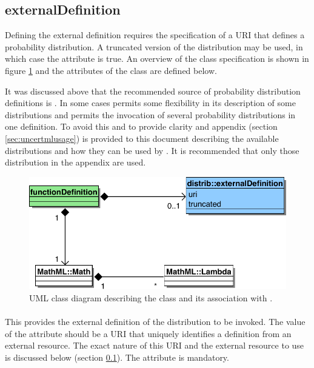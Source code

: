 \documentclass[draftspec]{sbmlpkgspec}
\begin{document}
\subsection{externalDefinition}
\label{sec:extlDefnDistn}

Defining the external definition requires the specification of a URI
that defines a probability distribution. A truncated version of the
distribution may be used, in which case the 
attribute is true. An overview of the class specification is shown in
figure \ref{fig:externalDefinitionUml} and the attributes of the class
are defined below.

It was discussed above that the recommended source of probability
distribution definitions is \uncertml. In some cases \uncertml permits
some flexibility in its description of some distributions and permits
the invocation of several probability distributions in one
definition. To avoid this and to provide clarity and appendix (section
\ref{sec:uncertmlusage}) is provided to this document describing the
available distributions and how they can be used by
\distribshort. It is recommended that only those distribution in the
appendix are used.

\begin{figure}[htb]
\includegraphics[width=0.75\linewidth]{externalDefinitionUML}
\caption{UML class diagram describing the 
  class and its association with .}
\label{fig:externalDefinitionUml}
\end{figure}

\paragraph{}

This provides the external definition of the distribution to be
invoked. The value of the attribute should be a URI that
uniquely identifies a definition from an external resource. The exact
nature of this URI and the external resource to use is discussed below
(section \ref{sec:extlDefnDistn}). The attribute is mandatory.
\end{document}
